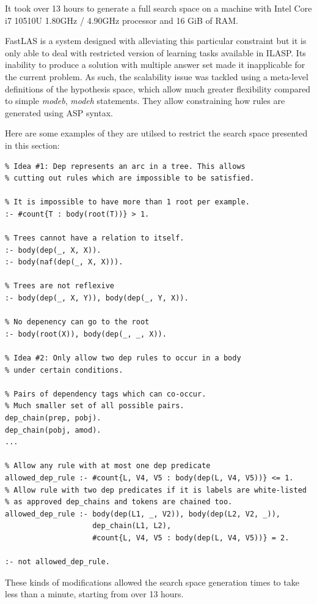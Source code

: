 It took over 13 hours to generate a full search space on a machine with Intel Core i7 10510U 1.80GHz / 4.90GHz processor and 16 GiB of RAM.

FastLAS is a system designed with alleviating this particular constraint but it is only able to deal with restricted version of learning tasks available in ILASP. 
Its inability to produce a solution with multiple answer set made it inapplicable for the current problem.
As such, the scalability issue was tackled using a meta-level definitions of the hypothesis space, which allow much greater flexibility compared to simple \textit{modeb}, \textit{modeh} statements. 
They allow constraining how rules are generated using ASP syntax.

Here are some examples of they are utilsed to restrict the search space presented in this section:
\begin{verbatim}
% Idea #1: Dep represents an arc in a tree. This allows 
% cutting out rules which are impossible to be satisfied.
    
% It is impossible to have more than 1 root per example.
:- #count{T : body(root(T))} > 1.

% Trees cannot have a relation to itself.
:- body(dep(_, X, X)).
:- body(naf(dep(_, X, X))).

% Trees are not reflexive
:- body(dep(_, X, Y)), body(dep(_, Y, X)).

% No depenency can go to the root
:- body(root(X)), body(dep(_, _, X)).

% Idea #2: Only allow two dep rules to occur in a body
% under certain conditions. 

% Pairs of dependency tags which can co-occur.
% Much smaller set of all possible pairs.
dep_chain(prep, pobj).
dep_chain(pobj, amod).
...

% Allow any rule with at most one dep predicate
allowed_dep_rule :- #count{L, V4, V5 : body(dep(L, V4, V5))} <= 1.
% Allow rule with two dep predicates if it is labels are white-listed
% as approved dep_chains and tokens are chained too.
allowed_dep_rule :- body(dep(L1, _, V2)), body(dep(L2, V2, _)), 
                    dep_chain(L1, L2), 
                    #count{L, V4, V5 : body(dep(L, V4, V5))} = 2.

:- not allowed_dep_rule.
\end{verbatim}

These kinds of modifications allowed the search space generation times to take less than a minute, starting from over 13 hours.


